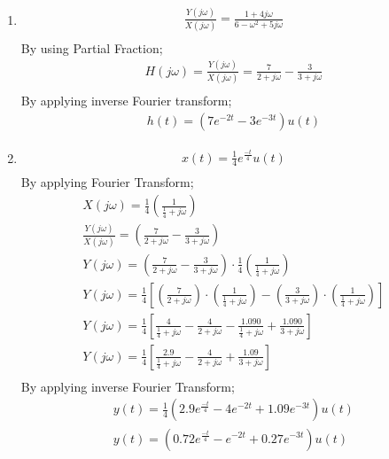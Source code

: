 \documentclass[10pt,a4paper, margin=1in]{article}
\begin{document}
\begin{enumerate}
\begin{enumerate}
    \item %
    \begin{align*}
        \frac{Y(j\omega)}{X(j\omega)} = \frac{1+4j\omega}{6-\omega^2+5j\omega}\\
    \end{align*}
By using Partial Fraction;
    \begin{align*}
        H(j\omega) = \frac{Y(j\omega)}{X(j\omega)} = \frac{7}{2 + j\omega} - \frac{3}{3 + j\omega}\\
    \end{align*}
By applying inverse Fourier transform;
    \begin{align*}
        h(t) = (7e^{-2t} - 3e^{-3t})u(t)
    \end{align*}
    \item %
    \begin{align*}
        x(t) = \frac{1}{4} e^{\frac{-t}{4}}u(t)\\
    \end{align*}
By applying Fourier Transform;
    \begin{align*}
        X(j\omega) = \frac{1}{4}(\frac{1}{\frac{1}{4}+j\omega})\\
        \frac{Y(j\omega)}{X(j\omega)} = (\frac{7}{2+j\omega} - \frac{3}{3+j\omega})\\
        Y(j\omega) = (\frac{7}{2+j\omega} - \frac{3}{3+j\omega})\cdot \frac{1}{4}(\frac{1}{\frac{1}{4}+j\omega})\\
        Y(j\omega) = \frac{1}{4}[(\frac{7}{2+j\omega})\cdot (\frac{1}{\frac{1}{4}+j\omega}) - (\frac{3}{3+j\omega})\cdot (\frac{1}{\frac{1}{4}+j\omega})]\\
        Y(j\omega) = \frac{1}{4} [\frac{4}{\frac{1}{4}+j\omega} - \frac{4}{2+j\omega} - \frac{1.090}{\frac{1}{4}+j\omega} + \frac{1.090}{3 + j\omega}]\\
        Y(j\omega) = \frac{1}{4}[\frac{2.9}{\frac{1}{4}+j\omega} - \frac{4}{2+j\omega} + \frac{1.09}{3 + j\omega}]\\
    \end{align*}
By applying inverse Fourier Transform;
    \begin{align*}
        y(t) = \frac{1}{4}(2.9e^{\frac{-t}{4}} - 4e^{-2t} + 1.09e^{-3t})u(t)\\
        y(t) = (0.72e^{\frac{-t}{4}} - e^{-2t} + 0.27e^{-3t})u(t)
    \end{align*}
    \end{enumerate}





\end{enumerate}
\end{document}
